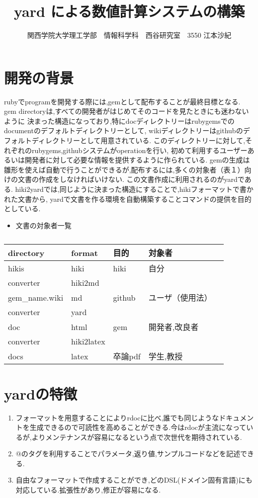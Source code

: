 \documentclass[10pt,a4j,twocolumn]{jsarticle}
\begin{document}
\title{yard による数値計算システムの構築}
\author{関西学院大学理工学部　情報科学科　西谷研究室　3550 江本沙紀}
\date{}
\maketitle
\section{開発の背景}
rubyでprogramを開発する際には,gemとして配布することが最終目標となる.
gem directoryは,すべての開発者がはじめてそのコードを見たときにも迷わないように
決まった構造になっており,特にdocディレクトリーはrubygemsでのdocumentのデフォルトディレクトリーとして,
wikiディレクトリーはgithubのデフォルトディレクトリーとして用意されている.
このディレクトリーに対して,それぞれのrubygems,githubシステムがoperationを行い,
初めて利用するユーザーあるいは開発者に対して必要な情報を提供するように作られている.
gemの生成は雛形を使えば自動で行うことができるが,配布するには,多くの対象者（表１）向けの文書の作成をしなければいけない.
この文書作成に利用されるのがyardである.
hiki2yardでは,同じように決まった構造にすることで,hikiフォーマットで書かれた文書から,
yardで文書を作る環境を自動構築することコマンドの提供を目的としている.
\begin{itemize}
\item 文書の対象者一覧
\end{itemize}
\begin{table}[htbp]\begin{center}
\caption{}
\begin{tabular}{lllll}
\hline
directory  &format  &目的   &対象者  \\ \hline
hikis   &hiki   &hiki   &自分  \\
converter   &hiki2md  \\
gem\_name.wiki   &md   &github  &ユーザ（使用法）  \\
converter   &yard\  \\
doc   &html   &gem   &開発者,改良者  \\
converter   &hiki2latex  \\
docs   &latex   &卒論pdf   &学生,教授  \\
\hline
\end{tabular}
\label{default}
\end{center}\end{table}

\section{yardの特徴}\begin{enumerate}
\item フォーマットを用意することによりrdocに比べ,誰でも同じようなドキュメントを生成できるので可読性を高めることができる.今はrdocが主流になっているが,よりメンテナンスが容易になるという点で次世代を期待されている\cite{a}.
\item @のタグを利用することでパラメータ,返り値,サンプルコードなどを記述できる\cite{b}.
\item 自由なフォーマットで作成することができ,どのDSL(ドメイン固有言語)にも対応している.拡張性があり,修正が容易になる\cite{c}.
\end{enumerate}
\end{document}
